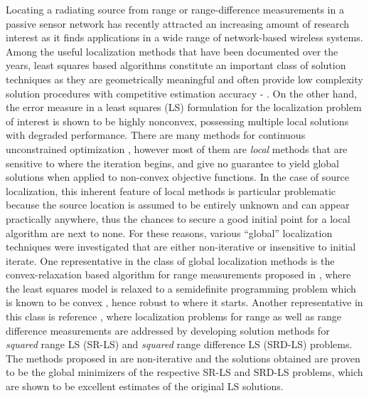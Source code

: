 \label{chapter:irw}

Locating a radiating source from range or range-difference measurements in a passive sensor network has recently attracted an increasing amount of research interest as it finds applications in a wide range of network-based wireless systems. Among the useful localization methods that have been documented over the years, least squares based algorithms constitute an important class of solution techniques as they are geometrically meaningful and often provide low complexity solution procedures with competitive estimation accuracy \cite{BeckStLi} - \cite{SmithAbel} . On the other hand, the error measure in a least squares (LS) formulation for the localization problem of interest is shown to be highly nonconvex, possessing multiple local solutions with degraded performance.  There are many methods for continuous unconstrained optimization \cite{AntonLu}, however most of them are \textit{local} methods that are
 sensitive to where the iteration begins, and give no guarantee to yield global solutions when applied to non-convex objective functions. In the case of source localization, this inherent feature of local methods is particular problematic because the source location is assumed to be entirely unknown and can appear practically anywhere, thus the chances to secure a good initial point for a local algorithm are next to none. For these reasons, various ``global'' localization techniques were investigated that are either non-iterative or insensitive to initial iterate. One representative in the class of global localization methods is the convex-relaxation based algorithm for range measurements proposed in \cite{Cheung}, where the least squares model is relaxed to a semidefinite programming problem which is known to be convex \cite{VBoyd}, hence robust to where it starts. Another representative in this class is reference \cite{BeckStLi}, where localization problems for  range as well as range difference measurements are addressed by developing solution methods for \textit{squared} range LS (SR-LS) and \textit{squared} range difference LS (SRD-LS) problems. The methods proposed in \cite{BeckStLi} are non-iterative and the solutions obtained are proven to be the global minimizers of the respective SR-LS and SRD-LS problems, which are shown to be excellent estimates of the original LS solutions.

